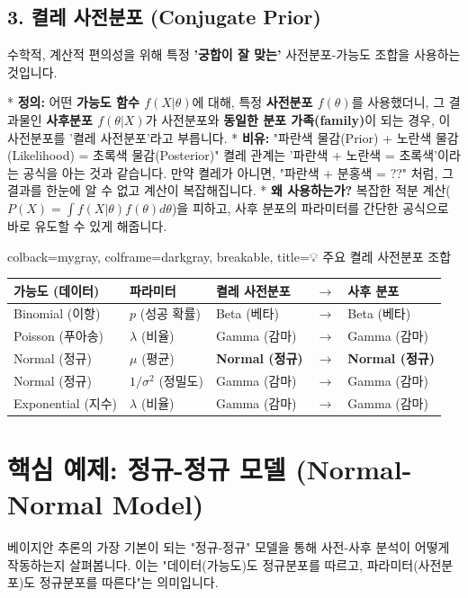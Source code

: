 \documentclass[11pt,a4paper]{book}
\theoremstyle{definition}
\begin{document}
\subsection{3. 켤레 사전분포 (Conjugate Prior)}

수학적, 계산적 편의성을 위해 특정 \textbf{'궁합이 잘 맞는'} 사전분포-가능도 조합을 사용하는 것입니다.

* \textbf{정의:} 어떤 \textbf{가능도 함수 $f(X|\theta)$}에 대해, 특정 \textbf{사전분포 $f(\theta)$}를 사용했더니,
    그 결과물인 \textbf{사후분포 $f(\theta|X)$}가 사전분포와 \textbf{동일한 분포 가족(family)}이 되는 경우,
    이 사전분포를 '켤레 사전분포'라고 부릅니다.
* \textbf{비유:} "파란색 물감(Prior) + 노란색 물감(Likelihood) = 초록색 물감(Posterior)"
    켤레 관계는 '파란색 + 노란색 = 초록색'이라는 공식을 아는 것과 같습니다.
    만약 켤레가 아니면, "파란색 + 분홍색 = ??" 처럼, 그 결과를 한눈에 알 수 없고 계산이 복잡해집니다.
* \textbf{왜 사용하는가?}
    복잡한 적분 계산($P(X) = \int f(X|\theta)f(\theta)d\theta$)을 피하고,
    사후 분포의 파라미터를 간단한 공식으로 바로 유도할 수 있게 해줍니다.

\begin{tcolorbox}{colback=mygray, colframe=darkgray, breakable, title=💡 주요 켤레 사전분포 조합}
    \begin{tabular}{lllll}
    \toprule
    \textbf{가능도 (데이터)} & \textbf{파라미터} & \textbf{켤레 사전분포} & $\to$ & \textbf{사후 분포} \\
    \midrule
    Binomial (이항) & $p$ (성공 확률) & Beta (베타) & $\to$ & Beta (베타) \\
    Poisson (푸아송) & $\lambda$ (비율) & Gamma (감마) & $\to$ & Gamma (감마) \\
    Normal (정규) & $\mu$ (평균) & \textbf{Normal (정규)} & $\to$ & \textbf{Normal (정규)} \\
    Normal (정규) & $1/\sigma^2$ (정밀도) & Gamma (감마) & $\to$ & Gamma (감마) \\
    Exponential (지수) & $\lambda$ (비율) & Gamma (감마) & $\to$ & Gamma (감마) \\
    \bottomrule
    \end{tabular}
\end{tcolorbox}


\section{핵심 예제: 정규-정규 모델 (Normal-Normal Model)}

베이지안 추론의 가장 기본이 되는 "정규-정규" 모델을 통해 사전-사후 분석이 어떻게 작동하는지 살펴봅니다.
이는 "데이터(가능도)도 정규분포를 따르고, 파라미터(사전분포)도 정규분포를 따른다"는 의미입니다.
\end{document}
